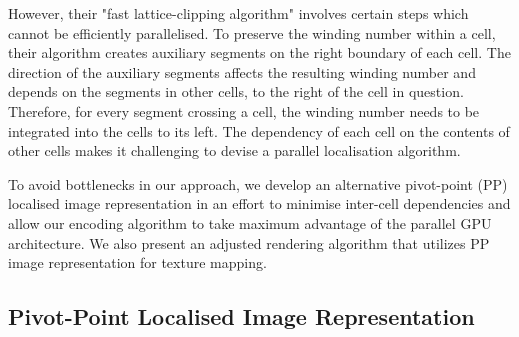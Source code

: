 \documentclass[11pt,a4paper,twoside]{article}
\begin{document}
However, their "fast lattice-clipping algorithm" involves certain steps which cannot be efficiently parallelised. To preserve the winding number within a cell, their algorithm creates auxiliary segments on the right boundary of each cell. The direction of the auxiliary segments affects the resulting winding number and depends on the segments in other cells, to the right of the cell in question. Therefore, for every segment crossing a cell, the winding number needs to be integrated into the cells to its left. The dependency of each cell on the contents of other cells makes it challenging to devise a parallel localisation algorithm.

To avoid bottlenecks in our approach, we develop an alternative pivot-point (PP) localised image representation in an effort to minimise inter-cell dependencies and allow our encoding algorithm to take maximum advantage of the parallel GPU architecture. We also present an adjusted rendering algorithm that utilizes PP image representation for texture mapping.

\subsection {Pivot-Point Localised Image Representation}
\end{document}
